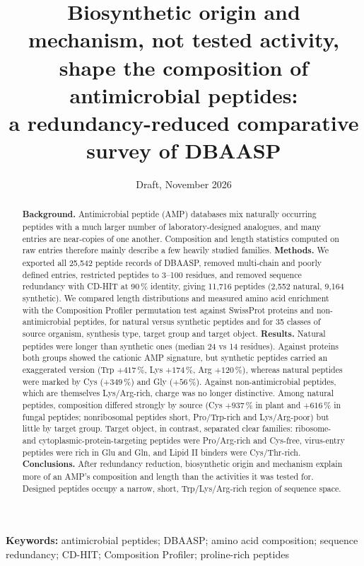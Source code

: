 \documentclass[11pt,a4paper]{article}
\title{\textbf{Biosynthetic origin and mechanism, not tested activity, shape the composition of antimicrobial peptides:\\a redundancy-reduced comparative survey of DBAASP}}
\author[1]{\todo{Author names}}
\affil[1]{\todo{Affiliation}}
\date{\small Draft, November 2026}
\begin{document}
\maketitle

\begin{abstract}
\noindent\textbf{Background.} Antimicrobial peptide (AMP) databases mix naturally occurring peptides with a much larger number of laboratory-designed analogues,
and many entries are near-copies of one another. Composition and length statistics computed on raw entries therefore mainly describe a few heavily studied families.
\textbf{Methods.} We exported all 25{,}542 peptide records of DBAASP, removed multi-chain and poorly defined entries, restricted peptides to 3--100 residues, and removed
sequence redundancy with CD-HIT at 90\,\% identity, giving 11{,}716 peptides (2{,}552 natural, 9{,}164 synthetic). We compared length distributions and measured amino acid enrichment
with the Composition Profiler permutation test against SwissProt proteins and non-antimicrobial peptides, for natural versus synthetic peptides and for 35 classes of source organism,
synthesis type, target group and target object.
\textbf{Results.} Natural peptides were longer than synthetic ones (median 24 vs 14 residues). Against proteins both groups showed the cationic AMP signature, but synthetic peptides carried
an exaggerated version (Trp $+417$\,\%, Lys $+174$\,\%, Arg $+120$\,\%), whereas natural peptides were marked by Cys ($+349$\,\%) and Gly ($+56$\,\%). Against non-antimicrobial peptides,
which are themselves Lys/Arg-rich, charge was no longer distinctive. Among natural peptides, composition differed strongly by source (Cys $+937$\,\% in plant and $+616$\,\% in fungal peptides;
nonribosomal peptides short, Pro/Trp-rich and Lys/Arg-poor) but little by target group. Target object, in contrast, separated clear families: ribosome- and cytoplasmic-protein-targeting peptides
were Pro/Arg-rich and Cys-free, virus-entry peptides were rich in Glu and Gln, and Lipid II binders were Cys/Thr-rich.
\textbf{Conclusions.} After redundancy reduction, biosynthetic origin and mechanism explain more of an AMP's composition and length than the activities it was tested for.
Designed peptides occupy a narrow, short, Trp/Lys/Arg-rich region of sequence space.
\end{abstract}

\noindent\textbf{Keywords:} antimicrobial peptides; DBAASP; amino acid composition; sequence redundancy; CD-HIT; Composition Profiler; proline-rich peptides
\end{document}
